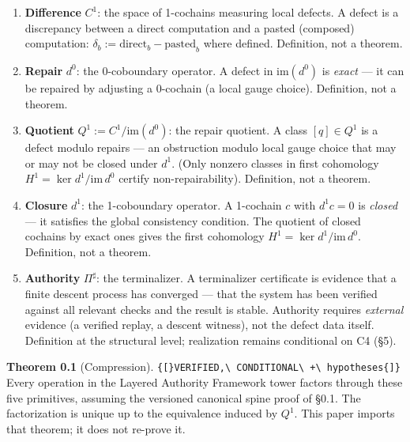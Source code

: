 \documentclass[
  10pt,
]{article}
\providecommand{\tightlist}{%
  \setlength{\itemsep}{0pt}\setlength{\parskip}{0pt}}
\providecommand{\tightlist}{%
  \setlength{\itemsep}{0pt}\setlength{\parskip}{0pt}}
\DeclareRobustCommand{\texttt}[1]{{\paperSymbolFont\nolinkurl{#1}}}
\begin{document}
\begin{enumerate}
\def\labelenumi{\arabic{enumi}.}
\tightlist
\item
  \textbf{Difference} \protect\hypertarget{math-E0012-0012}{}{\(C^1\)}: the space of 1-cochains measuring local defects. A defect is a discrepancy between a direct computation and a pasted (composed) computation: \protect\hypertarget{math-E0013-0013}{}{\(\delta_b := \text{direct}_b - \text{pasted}_b\)} where defined. Definition, not a theorem.
\item
  \textbf{Repair} \protect\hypertarget{math-E0014-0014}{}{\(d^0\)}: the 0-coboundary operator. A defect in \protect\hypertarget{math-E0015-0015}{}{\(\text{im}(d^0)\)} is \emph{exact} --- it can be repaired by adjusting a 0-cochain (a local gauge choice). Definition, not a theorem.
\item
  \textbf{Quotient} \protect\hypertarget{math-E0016-0016}{}{\(Q^1 := C^1 / \text{im}(d^0)\)}: the repair quotient. A class \protect\hypertarget{math-E0017-0017}{}{\([q] \in Q^1\)} is a defect modulo repairs --- an obstruction modulo local gauge choice that may or may not be closed under \protect\hypertarget{math-E0018-0018}{}{\(d^1\)}. (Only nonzero classes in first cohomology \protect\hypertarget{math-E0019-0019}{}{\(H^1 = \ker d^1 / \text{im}\,d^0\)} certify non-repairability). Definition, not a theorem.
\item
  \textbf{Closure} \protect\hypertarget{math-E0018-0020}{}{\(d^1\)}: the 1-coboundary operator. A 1-cochain \protect\hypertarget{math-E0020-0021}{}{\(c\)} with \protect\hypertarget{math-E0021-0022}{}{\(d^1 c = 0\)} is \emph{closed} --- it satisfies the global consistency condition. The quotient of closed cochains by exact ones gives the first cohomology \protect\hypertarget{math-E0019-0023}{}{\(H^1 = \ker d^1 / \text{im}\,d^0\)}. Definition, not a theorem.
\item
  \textbf{Authority} \protect\hypertarget{math-E0022-0024}{}{\(\Pi^\sharp\)}: the terminalizer. A terminalizer certificate is evidence that a finite descent process has converged --- that the system has been verified against all relevant checks and the result is stable. Authority requires \emph{external} evidence (a verified replay, a descent witness), not the defect data itself. Definition at the structural level; realization remains conditional on C4 (§5).
\end{enumerate}

\textbf{Theorem 0.1} (Compression). \texttt{{[}VERIFIED,\ CONDITIONAL\ +\ hypotheses{]}} Every operation in the Layered Authority Framework tower factors through these five primitives, assuming the versioned canonical spine proof of §0.1. The factorization is unique up to the equivalence induced by \protect\hypertarget{math-E0006-0025}{}{\(Q^1\)}. This paper imports that theorem; it does not re-prove it.
\end{document}
